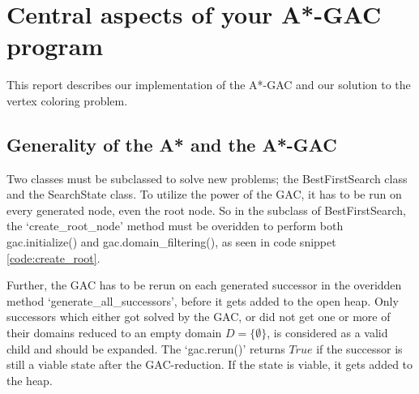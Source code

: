 
\section{Central aspects of your A*-GAC program}
This report describes our implementation of the A*-GAC and our solution to the vertex coloring problem.

\subsection{Generality of the A* and the A*-GAC}
Two classes must be subclassed to solve new problems; the BestFirstSearch class and the SearchState class. To utilize the power of the GAC, it has to be run on every generated node, even the root node. So in the subclass of BestFirstSearch, the `create\_root\_node' method must be overidden to perform both gac.initialize() and gac.domain\_filtering(), as seen in code snippet \ref{code:create_root}.



Further, the GAC has to be rerun on each generated successor in the overidden method `generate\_all\_successors', before it gets added to the open heap. Only successors which either got solved by the GAC, or did not get one or more of their domains reduced to an empty domain \( D = \{ \emptyset \}\), is considered as a valid child and should be expanded. The `gac.rerun()' returns \(True\) if the successor is still a viable state after the GAC-reduction. If the state is viable, it gets added to the heap.

